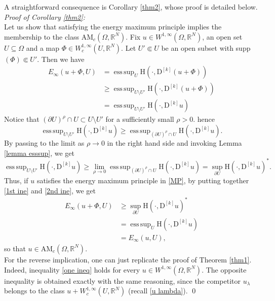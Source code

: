 \documentclass[a4paper,11pt]{article}
\numberwithin{equation}{section}
\newcommand{\numberset}{\mathbb}
\newcommand{\Om}{\Omega}
\newcommand{\R}{\numberset{R}}
\newcommand{\rom}{\mathrm}
\DeclareMathOperator*{\esssup}{ess\,sup}
\theoremstyle{definition}
\begin{document}
A straightforward consequence is Corollary \ref{thm2}, whose proof is detailed below.\\

\textit{Proof of Corollary \ref{thm2}:}\\
Let us show that satisfying the energy maximum principle implies the membership to the class $ \mathrm {AM}_c(\Om,\R^N)$. Fix $u\in W^{1,\infty}(\Om,\R^N)$, an open set $U\subseteq\Om$ and a map $\Phi\in W^{1,\infty}_c(U,\R^N)$. Let $U'\Subset U$ be an open subset with supp$(\Phi)\Subset U'$. Then we have
\begin{equation}\label{1st ine}
\begin{aligned}
E_\infty(u+\Phi,U)&=\esssup_U \rom{H}(\cdot, \mathrm D^{[k]}(u+\Phi))\\
&\geq \esssup_{U\setminus U'}\rom{H}(\cdot, \mathrm D^{[k]}(u+\Phi))\\
&=\esssup_{U\setminus U'}\rom{H}(\cdot, \mathrm D^{[k]}u)
\end{aligned}
\end{equation}
Notice that $(\partial U)^\rho\cap U\subset U\setminus U'$ for a sufficiently small $\rho>0$. hence
$$
\esssup_{U\setminus U'}\rom{H}(\cdot, \mathrm D^{[k]}u)\geq \esssup_{(\partial U)^\rho\cap U}\rom{H}(\cdot, \mathrm D^{[k]}u).
$$
By passing to the limit as $\rho\to 0$ in the right hand side and invoking Lemma \ref{lemma esssup}, we get
\begin{equation}\label{2nd ine}
\esssup_{U\setminus U'}\rom{H}(\cdot, \mathrm D^{[k]}u)\geq \lim_{\rho\to0}\esssup_{(\partial U)^\rho\cap U}\rom{H}(\cdot, \mathrm D^{[k]}u)=\sup_{\partial U}\rom{H}(\cdot, \mathrm D^{[k]}u)^*.
\end{equation}
Thus, if $u$ satisfies the energy maximum principle in \eqref{MP}, by putting together \eqref{1st ine} and \eqref{2nd ine}, we get
\begin{align*}
E_\infty(u+\Phi,U)&\geq\sup_{\partial U}\rom{H}(\cdot, \mathrm D^{[k]}u)^*\\
&=\esssup_{U}\rom{H}(\cdot, \mathrm D^{[k]}u)\\
&=E_\infty(u,U),
\end{align*}
so that $u\in \mathrm{AM}_c(\Om,\R^N)$.\\
For the reverse implication, one can just replicate the proof of Theorem \ref{thm1}. Indeed, inequality \eqref{one ineq} holds for every $u\in W^{1,\infty}(\Om,\R^N)$. The opposite inequality is obtained exactly with the same reasoning, since the competitor $u_\lambda$ belongs to the class $u+W^{1,\infty}_c(U,\R^N)$ (recall \eqref{u lambda}).
\qed
\end{document}
